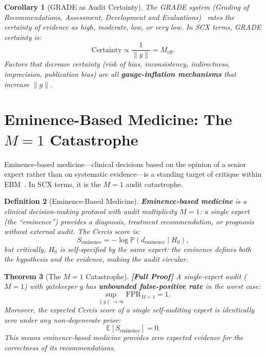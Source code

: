\documentclass[12pt,a4paper]{article}
\newtheorem{theorem}{Theorem}[section]
\newtheorem{corollary}[theorem]{Corollary}
\newtheorem{definition}[theorem]{Definition}
\theoremstyle{remark}
\newcommand{\E}{\mathbb{E}}
\newcommand{\Pbb}{\mathbb{P}}
\newcommand{\SCX}{\textsf{SCX}}
\newcommand{\Cercis}{\textsf{Cercis}}
\newcommand{\rigorFull}{\textbf{[Full Proof]}}
\begin{document}
\begin{corollary}[GRADE as Audit Certainty]
\label{cor:grade}
The GRADE system (Grading of Recommendations, Assessment, Development and
Evaluations)~\cite{guyatt2008grade} rates the certainty of evidence as
high, moderate, low, or very low. In \SCX{} terms, GRADE certainty is:
\begin{equation}
  \text{Certainty} \propto \frac{1}{\|g\|} = M_{\text{eff}}.
\end{equation}
Factors that decrease certainty (risk of bias, inconsistency, indirectness,
imprecision, publication bias) are all \textbf{gauge-inflation mechanisms}
that increase $\|g\|$.
\end{corollary}


\section{Eminence-Based Medicine: The $M=1$ Catastrophe}
\label{sec:eminence}

Eminence-based medicine---clinical decisions based on the opinion of a
senior expert rather than on systematic evidence---is a standing target of
critique within EBM~\cite{isaacs1999evidence}. In \SCX{} terms, it is the
$M=1$ audit catastrophe.

\begin{definition}[Eminence-Based Medicine]
\label{def:eminence}
\textbf{Eminence-based medicine} is a clinical decision-making protocol with
audit multiplicity $M=1$: a single expert (the ``eminence'') provides a
diagnosis, treatment recommendation, or prognosis without external audit.
The \Cercis{} score is:
\begin{equation}
  S_{\text{eminence}} = -\log \Pbb(d_{\text{eminence}} \mid H_0),
\end{equation}
but critically, $H_0$ is self-specified by the same expert: the eminence
defines both the hypothesis and the evidence, making the audit circular.
\end{definition}

\begin{theorem}[The $M=1$ Catastrophe]
\label{thm:m1_catastrophe}
\rigorFull
A single-expert audit ($M=1$) with gatekeeper $g$ has
\textbf{unbounded false-positive rate} in the worst case:
\begin{equation}
  \sup_{\|g\| \to \infty} \text{FPR}_{M=1} = 1.
\end{equation}
Moreover, the expected \Cercis{} score of a single self-auditing expert is
identically zero under any non-degenerate prior:
\begin{equation}
  \E[S_{\text{eminence}}] = 0.
\end{equation}
This means eminence-based medicine provides zero expected evidence for the
correctness of its recommendations.
\end{theorem}
\end{document}
